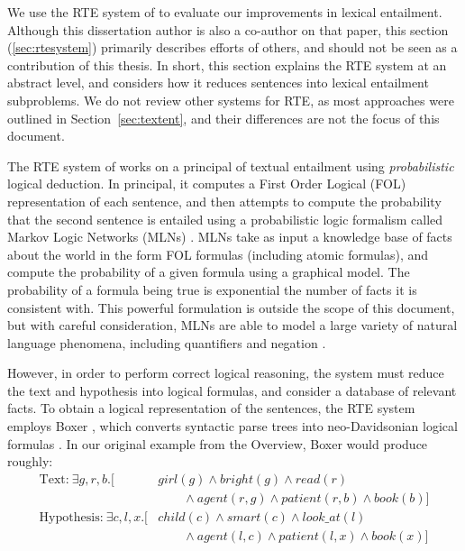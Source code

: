 We use the RTE system of  to evaluate our improvements
in lexical entailment. Although this dissertation author is also a co-author on
that paper, this section (\ref{sec:rtesystem}) primarily describes efforts of
others, and should not be seen as a contribution of this thesis. In short,
this section explains the RTE system at an abstract level, and considers how it
reduces sentences into lexical entailment subproblems. We do not review other
systems for RTE, as most approaches were outlined in
Section~\ref{sec:textent}, and their differences are not the focus of this
document.

The RTE system of  works on a principal of textual
entailment using {\em probabilistic} logical deduction. In principal, it
computes a First Order Logical (FOL) representation of each sentence, and
then attempts to compute the probability that the second sentence is entailed
using a probabilistic logic formalism called
Markov Logic Networks (MLNs) \cite{richardson:2006:ml}. MLNs take as input a
knowledge base of facts about the world in the form FOL formulas (including
atomic formulas), and compute the probability of a given formula using a
graphical model. The probability of a formula being true is exponential the
number of facts it is consistent with. This powerful formulation is outside
the scope of this document, but with careful consideration, MLNs are able
to model a large variety of natural language phenomena, including
quantifiers and negation \cite{beltagy:2016:phd}.

However, in order to perform correct logical reasoning, the system must reduce
the text and hypothesis into logical formulas, and consider a database of
relevant facts. To obtain a logical representation of the sentences, the
RTE system employs Boxer \cite{bos:2008:step}, which converts syntactic parse
trees into neo-Davidsonian logical formulas \cite{parsons:1990:events}. In our
original example from the Overview, Boxer would produce roughly:
\begin{align*}
  \mbox{Text:}~\exists g,r,b.[ & girl(g) \wedge bright(g) \wedge read(r) \\
                               & \qquad \wedge agent(r, g) \wedge patient(r, b) \wedge book(b)]\\
  \mbox{Hypothesis:}~\exists c,l,x.[ & child(c) \wedge smart(c) \wedge look\_at(l) \\
                               & \qquad \wedge agent(l, c) \wedge patient(l, x) \wedge book(x)]
\end{align*}

